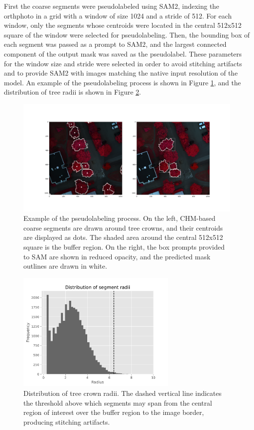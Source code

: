 \documentclass[english, 12pt, a4paper, sci, utf8, a-2b, online]{aaltothesis}
\begin{document}
\begin{enumerate}
\begin{end}
First the coarse segments were pseudolabeled using SAM2, indexing the orthphoto in a grid with a window of size 1024 and a stride of 512. For each window, only the segments whose centroids were located in the central 512x512 square of the window were selected for pseudolabeling. Then, the bounding box of each segment was passed as a prompt to SAM2, and the largest connected component of the output mask was saved as the pseudolabel. These parameters for the window size and stride were selected in order to avoid stitching artifacts and to provide SAM2 with images matching the native input resolution of the model. An example of the pseudolabeling process is shown in Figure \ref{fig:pseudolabel}, and the distribution of tree radii is shown in Figure \ref{fig:radii}.

\begin{figure}[h]
    \centering
    \includegraphics[width=1.0\textwidth]{figures/pseudolabel-example.png}
    \caption{Example of the pseudolabeling process. On the left, CHM-based coarse segments are drawn around tree crowns, and their centroids are displayed as dots. The shaded area around the central 512x512 square is the buffer region. On the right, the box prompts provided to SAM are shown in reduced opacity, and the predicted mask outlines are drawn in white.}
    \label{fig:pseudolabel}
\end{figure}

\begin{figure}[h]
    \centering
    \includegraphics[width=0.7\textwidth]{figures/radii.pdf}
    \caption{Distribution of tree crown radii. The dashed vertical line indicates the threshold above which segments may span from the central region of interest over the buffer region to the image border, producing stitching artifacts.}
    \label{fig:radii}
\end{figure}


\end{end}
\end{enumerate}
\end{document}
